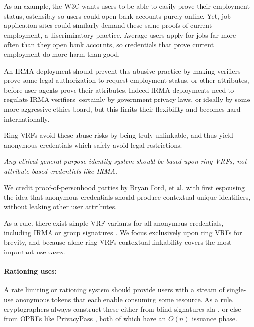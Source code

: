 As an example, the W3C wants users to be able to easily prove their
employment status, ostensibly so users could open bank accounts purely
online.  Yet, job application sites could similarly demand these same
proofs of current employment, a discriminatory practice.
Average users apply for jobs far more often than they open bank accounts,
so credentials that prove current employment do more harm than good.

An IRMA deployment should prevent this abusive practice by making
verifiers prove some legal authorization to request employment status,
or other attributes, before user agents prove their attributes.
Indeed IRMA deployments need to regulate IRMA verifiers, certainly by
government privacy laws, or ideally by some more aggressive ethics board,
but this limits their flexibility and becomes hard internationally.

Ring VRFs avoid these abuse risks by being truly unlinkable, and thus
yield anonymous credentials which safely avoid legal restrictions.

{\it Any ethical general purpose identity system should be based
upon ring VRFs, not attribute based credentials like IRMA.}

We credit proof-of-personhood parties by Bryan Ford, et al. \cite{pop2008,pop2017}
with first espousing the idea that anonymous credentials should produce
contextual unique identifiers, without leaking other user attributes.

As a rule, there exist simple VRF variants for all anonymous credentials,
including IRMA \cite{IRMAcredentials} or group signatures \cite{group_sig_survey}.
We focus exclusively upon ring VRFs for brevity, and because alone
ring VRFs contextual linkability covers the most important use cases.

\paragraph{Rationing uses:}

A rate limiting or rationing system should provide users with a stream
of single-use anonymous tokens that each enable consuming some resource.
As a rule, cryptographers always construct these either
 from blind signatures ala \cite{chaum83}, or else
 from OPRFs like PrivacyPass \cite{PrivacyPass},
both of which have an $O(n)$ issuance phase.

